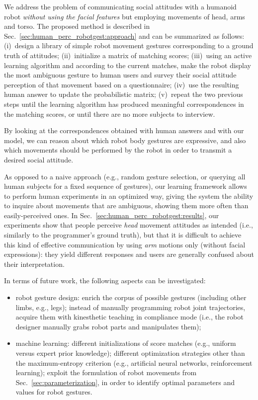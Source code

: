 We address the problem of communicating social attitudes with a humanoid robot \emph{without using the facial features} but employing movements of head, arms and torso. The proposed method is described in Sec.~\ref{sec:human_perc_robotgest:approach} and can be summarized as follows: (i)~design a library of simple robot movement gestures corresponding to a ground truth of attitudes; (ii)~initialize a matrix of \gestatt{} matching scores; (iii)~using an active learning algorithm and according to the current matches, make the robot display the most ambiguous gesture to human users and survey their social attitude perception of that movement based on a questionnaire; (iv)~use the resulting human answer to update the \gestatt{} probabilistic matrix; (v)~repeat the two previous steps until the learning algorithm has produced meaningful correspondences in the matching scores, or until there are no more subjects to interview.

By looking at the \gestatt{} correspondences obtained with human answers and with our model, we can reason about which robot body gestures are expressive, and also which movements should be performed by the robot in order to transmit a desired social attitude.

As opposed to a naive approach (e.g., random gesture selection, or querying all human subjects for a fixed sequence of gestures), our learning framework allows to perform human experiments in an optimized way, giving the system the ability to inquire about movements that are ambiguous, showing them more often than easily-perceived ones. In Sec.~\ref{sec:human_perc_robotgest:results}, our experiments show that people perceive \emph{head} movement attitudes as intended (i.e., similarly to the programmer's ground truth), but that it is difficult to achieve this kind of effective communication by using \emph{arm} motions only (without facial expressions): they yield different responses and users are generally confused about their interpretation.

In terms of future work, the following aspects can be investigated:
\begin{itemize}
\item robot gesture design: enrich the corpus of possible gestures (including other limbs, e.g., legs); instead of manually programming robot joint trajectories, acquire them with kinesthetic teaching in compliance mode (i.e., the robot designer manually grabs robot parts and manipulates them);

\item machine learning: different initializations of score matches (e.g., uniform versus expert prior knowledge); different optimization strategies other than the maximum-entropy criterion (e.g., artificial neural networks, reinforcement learning); exploit the \gestparval{} formulation of robot movements from Sec.~\ref{sec:parameterization}, in order to identify optimal parameters and values for robot gestures.
\end{itemize}
